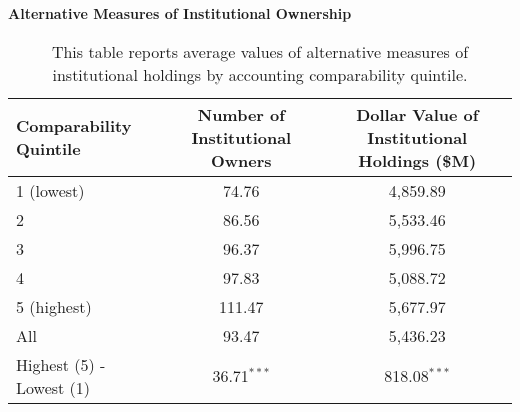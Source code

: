 \begin{table}[htbp]
\footnotesize
  \centering
  \caption{\textbf{Alternative Measures of Institutional Ownership}}
  \caption*{This table reports average values of alternative measures of institutional holdings by accounting comparability quintile.}
    \begin{tabular}{lcc}
    \toprule
    Comparability Quintile & \multicolumn{1}{c}{Number of Institutional Owners} & \multicolumn{1}{c}{Dollar Value of Institutional Holdings (\$M)} \\
    \midrule
    1 (lowest) & \multicolumn{1}{c}{74.76} & \multicolumn{1}{c}{4,859.89} \\
    2 & \multicolumn{1}{c}{86.56} & \multicolumn{1}{c}{5,533.46} \\
	3 & \multicolumn{1}{c}{96.37} & \multicolumn{1}{c}{5,996.75} \\
    4 & \multicolumn{1}{c}{97.83} & \multicolumn{1}{c}{5,088.72} \\
    5 (highest) & \multicolumn{1}{c}{111.47} & \multicolumn{1}{c}{5,677.97} \\
    All   & \multicolumn{1}{c}{93.47} & \multicolumn{1}{c}{5,436.23} \\
    Highest (5) - Lowest (1) &   36.71$^{***}$ & 818.08$^{***}$ \\
    \bottomrule
    \end{tabular}%
  \label{alt-iomeasures}%
\end{table}%
